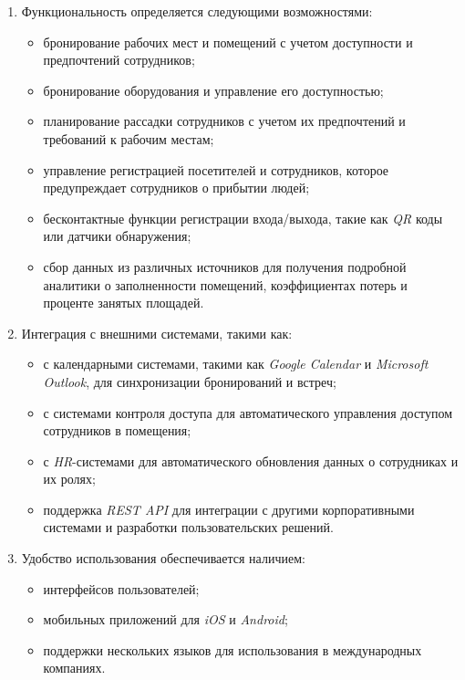 \begin{enumerate}
    \item Функциональность определяется следующими возможностями:
        \begin{itemize}
            \item бронирование рабочих мест и помещений с учетом доступности и предпочтений сотрудников;
            \item бронирование оборудования и управление его доступностью;
            \item планирование рассадки сотрудников с учетом их предпочтений и требований к рабочим местам;
            \item управление регистрацией посетителей и сотрудников, которое предупреждает сотрудников о прибытии людей;
            \item бесконтактные функции регистрации входа/выхода, такие как \textit{QR} коды или датчики обнаружения;
            \item сбор данных из различных источников для получения подробной аналитики о заполненности помещений, коэффициентах потерь и проценте занятых площадей.
        \end{itemize}

    \item Интеграция с внешними системами, такими как:
        \begin{itemize}
            \item с календарными системами, такими как \textit{Google Calendar} и \textit{Microsoft Outlook}, для синхронизации бронирований и встреч;
            \item с системами контроля доступа для автоматического управления доступом сотрудников в помещения;
            \item с \textit{HR}-системами для автоматического обновления данных о сотрудниках и их ролях;
            \item поддержка \textit{REST API} для интеграции с другими корпоративными системами и разработки пользовательских решений.
        \end{itemize}

    \item Удобство использования обеспечивается наличием:
        \begin{itemize}
            \item интерфейсов пользователей;
            \item мобильных приложений для \textit{iOS} и \textit{Android};
            \item поддержки нескольких языков для использования в международных компаниях.
        \end{itemize}


\end{enumerate}
